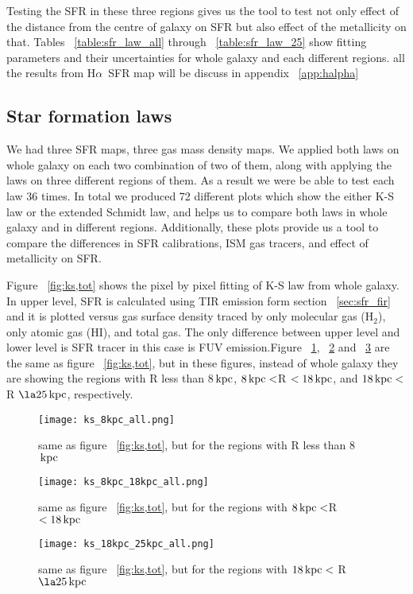 \documentclass[useAMS,usenatbib]{mn2e}
\newcommand \kpc        {\,{\rm kpc}}
\newcommand \halpha    {H$\alpha $\ }
\begin{document}
Testing the SFR in these three regions gives us the tool to test not only effect of the distance from the centre of galaxy on SFR but also effect of the metallicity on that. Tables ~\ref{table:sfr_law_all} through ~\ref{table:sfr_law_25} show fitting parameters and their uncertainties for whole galaxy and each different regions. all the results from \halpha SFR map will be discuss in appendix ~\ref{app:halpha} %

\subsection{Star formation laws}
We had three SFR maps, three gas mass density maps. We applied both laws on whole galaxy on each two combination of two of them, along with applying the laws on three different regions of them. As a result we were be able to test each law 36 times. In total we produced 72 different plots which show the either K-S law or the extended Schmidt law, and helps us to compare both laws in whole galaxy and in different regions. Additionally, these plots provide us a tool to compare the differences in SFR calibrations, ISM gas tracers, and effect of metallicity on SFR.    

Figure ~\ref{fig:ks,tot} shows the pixel by pixel fitting of K-S law from whole galaxy. In upper level, SFR is calculated using TIR emission form section ~\ref{sec:sfr_fir} and it is plotted versus gas surface density traced by only molecular gas (H$_2$),  only atomic gas (HI), and total gas. The only difference between upper level and lower level is SFR tracer in this case is FUV emission.Figure ~\ref{fig:ks,8}, ~\ref{fig:ks,18} and ~\ref{fig:ks,25} are the same as figure ~\ref{fig:ks,tot}, but in these figures, instead of whole galaxy they are showing the regions with R less than 8$\kpc$, $8\kpc < $R $< 18\kpc$, and $18\kpc <$ R $\la 25\kpc$, respectively.  

\begin{figure*}
\centering
\texttt{[image: ks\_8kpc\_all.png]}
\caption{same as figure ~\ref{fig:ks,tot}, but for the regions with R less than 8$\kpc$ }
\label{fig:ks,8}
\end{figure*}

\begin{figure*}
\centering
\texttt{[image: ks\_8kpc\_18kpc\_all.png]}
\caption{same as figure ~\ref{fig:ks,tot}, but for the regions with $8\kpc < $R $< 18\kpc$}
\label{fig:ks,18}
\end{figure*}

\begin{figure*}
\centering
\texttt{[image: ks\_18kpc\_25kpc\_all.png]}
\caption{same as figure ~\ref{fig:ks,tot}, but for the regions with $18\kpc <$ R $\la 25\kpc$}
\label{fig:ks,25}
\end{figure*}
\end{document}
